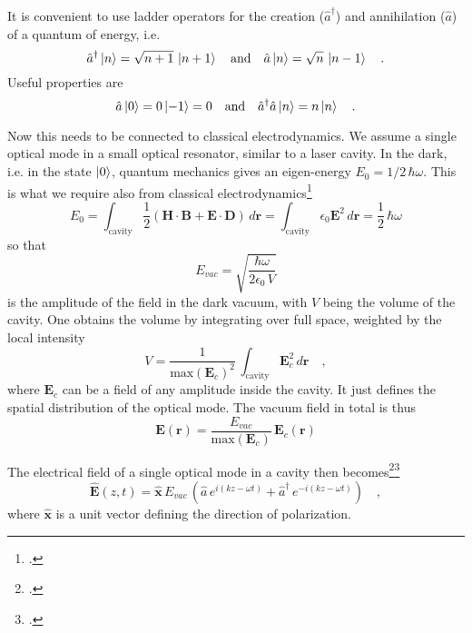 It is convenient to use ladder operators for the creation ($\hat{a}^\dagger$) and annihilation ($\hat{a}$) of  a quantum of energy, i.e.
\begin{equation}
 \hat{a}^\dagger \ket{n} = \sqrt{n+1}\, \ket{n+1}  \quad \text{and} \quad
  \hat{a} \ket{n} = \sqrt{n}\, \ket{n-1} \quad .
\end{equation}
Useful properties are 
\begin{equation}
 \hat{a} \ket{0} = 0 \ket{-1} = 0 \quad \text{and} \quad
  \hat{a}^\dagger  \hat{a} \ket{n} = n \ket{n} \quad .
\end{equation}

Now this needs to be connected to  classical electrodynamics. We assume a single optical mode in a small optical resonator, similar to a laser cavity. In the dark, i.e. in the state $\ket{0}$, quantum mechanics gives an eigen-energy $E_0 = 1/2 \, \hbar \omega$. This is what we require also from classical electrodynamics\footcite[chap. 7.5]{Fox}
\begin{equation}
E_0 = 
 \int_\text{cavity} \frac{1}{2} 
 \left( \boldsymbol{H} \cdot  \boldsymbol{B} + \boldsymbol{E} \cdot  \boldsymbol{D} \right) \, d\boldsymbol{r} = 
  \int_\text{cavity}  \epsilon_0 \boldsymbol{E}^2 \, d\boldsymbol{r} = \frac{1}{2} \, \hbar \omega
\end{equation}
so that
\begin{equation}
E_{vac} = \sqrt{\frac{\hbar \omega}{2 \epsilon_0 \, V}}
\end{equation}
is the amplitude of the field in the dark vacuum, with $V$ being the volume of the cavity. One obtains the volume by integrating over full space, weighted by the local intensity
\begin{equation}
V =  \frac{1}{\text{max}(\boldsymbol{E}_c)^2} \, \int_\text{cavity} \boldsymbol{E}_c^2\, d\boldsymbol{r} \quad ,
\end{equation}
where $\boldsymbol{E}_c$ can be a field of any amplitude inside the cavity. It just defines the spatial distribution of the optical mode. The vacuum field in total is thus
\begin{equation}
\boldsymbol{E}( \boldsymbol{r} ) = 
\frac{  E_{vac}  }{\text{max}(\boldsymbol{E}_c)}
 \, \boldsymbol{E}_c ( \boldsymbol{r} )
\end{equation}


The electrical field of a single optical mode in a cavity then becomes\footcite[chap. 2.1 and 2.4]{GerryKnight2005}\footcite[chap. 6.1]{Rand2016}
\begin{equation}
\hat{\boldsymbol{E}}(z,t) = \boldsymbol{\hat{x}} \, E_{vac} \, \left(\hat{a} \, e^{i (k z - \omega t)} + \hat{a}^\dagger   \, e^{-i (k z - \omega t)} \right) 
\quad ,
\end{equation}
where $\boldsymbol{\hat{x}}$ is a unit vector defining the direction of polarization. 


